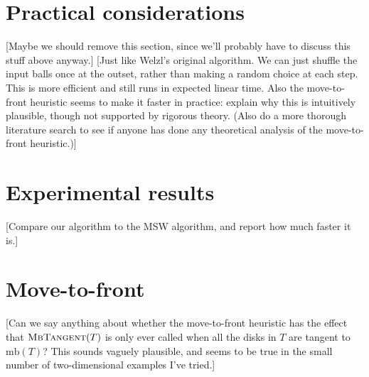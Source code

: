 \documentclass[a4paper]{article}
\newcommand\alg[1]{\mbox{\textsc{#1}}}
\newcommand\mb{\mathrm{mb}}
\begin{document}
\section{Practical considerations}
[Maybe we should remove this section, since we'll probably have to discuss this stuff above anyway.]
[Just like Welzl’s original algorithm. We can just shuffle the input balls once at the outset, rather than making a random choice at each step. This is more efficient and still runs in expected linear time. Also the move-to-front heuristic seems to make it faster in practice: explain why this is intuitively plausible, though not supported by rigorous theory. (Also do a more thorough literature search to see if anyone has done any theoretical analysis of the move-to-front heuristic.)]

\section{Experimental results}
[Compare our algorithm to the MSW algorithm, and report how much faster it is.]

\section{Move-to-front}
[Can we say anything about whether the move-to-front heuristic has the effect that $\alg{MbTangent}(T)$ is only ever called when all the disks in $T$ are tangent to $\mb(T)$? This sounds vaguely plausible, and seems to be true in the small number of two-dimensional examples I've tried.]


\end{document}
